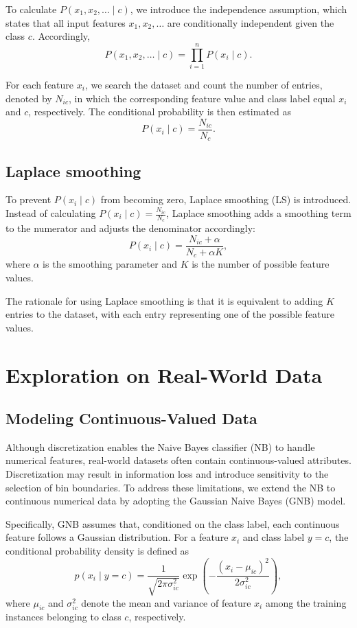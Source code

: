 \documentclass[10pt,a4paper]{article}
\begin{document}
	To calculate $P(x_1, x_2, \ldots \mid c)$, we introduce the independence assumption, which states that all input features $x_1, x_2, \ldots$ are conditionally independent given the class $c$. Accordingly,
	\begin{equation}
		\label{equ:p}
		P(x_1, x_2, \ldots \mid c)
		= \prod_{i=1}^{n} P(x_i \mid c).
	\end{equation}
	
	For each feature $x_i$, we search the dataset and count the number of entries, denoted by $N_{ic}$, in which the corresponding feature value and class label equal $x_i$ and $c$, respectively. The conditional probability is then estimated as
	\[
	P(x_i \mid c) = \frac{N_{ic}}{N_c}.
	\]
	
	
	\subsection{Laplace smoothing}
	
	To prevent $P(x_i \mid c)$ from becoming zero, Laplace smoothing (LS) is introduced. Instead of calculating $P(x_i \mid c) = \frac{N_{ic}}{N_c}$, Laplace smoothing adds a smoothing term to the numerator and adjusts the denominator accordingly:
	\[
	P(x_i \mid c)
	= \frac{N_{ic} + \alpha}{N_c + \alpha K},
	\]
	where $\alpha$ is the smoothing parameter and $K$ is the number of possible feature values.
	
	The rationale for using Laplace smoothing is that it is equivalent to adding $K$ entries to the dataset, with each entry representing one of the possible feature values.
	
	
	\section{Exploration on Real-World Data}
	
	\subsection{Modeling Continuous-Valued Data}
	
	Although discretization enables the Naive Bayes classifier (NB) to handle numerical features, real-world datasets often contain continuous-valued attributes. Discretization may result in information loss and introduce sensitivity to the selection of bin boundaries. To address these limitations, we extend the NB to continuous numerical data by adopting the Gaussian Naive Bayes (GNB) model.
	
	Specifically, GNB assumes that, conditioned on the class label, each continuous feature follows a Gaussian distribution. For a feature $x_i$ and class label $y=c$, the conditional probability density is defined as
	\begin{equation}
		p(x_i \mid y=c)
		=
		\frac{1}{\sqrt{2\pi\sigma_{ic}^{2}}}
		\exp\left(
		-\frac{(x_i-\mu_{ic})^2}{2\sigma_{ic}^{2}}
		\right),
	\end{equation}
	where $\mu_{ic}$ and $\sigma_{ic}^{2}$ denote the mean and variance of feature $x_i$ among the training instances belonging to class $c$, respectively.
	
\end{document}
